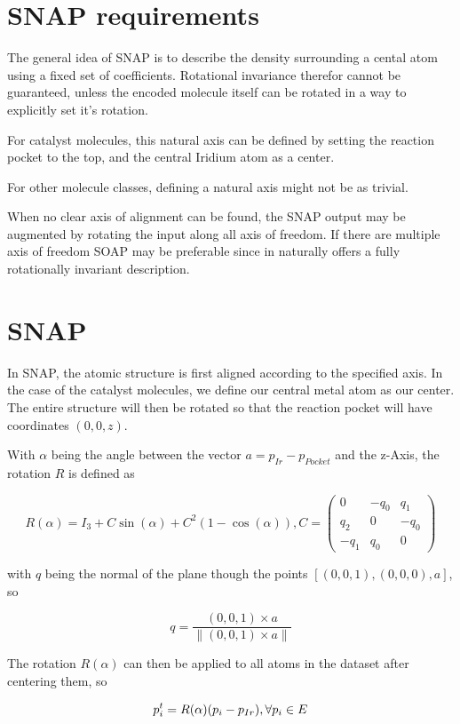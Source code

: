 \section{SNAP requirements}

The general idea of SNAP is to describe the density surrounding a cental atom using a fixed set of coefficients.
Rotational invariance therefor cannot be guaranteed, unless the encoded molecule itself can be rotated in a way to explicitly set it's rotation.

For catalyst molecules, this natural axis can be defined by setting the reaction pocket to the top, and the central Iridium atom as a center.

For other molecule classes, defining a natural axis might not be as trivial.

When no clear axis of alignment can be found, the SNAP output may be augmented by rotating the input along all axis of freedom.
If there are multiple axis of freedom SOAP may be preferable since in naturally offers a fully rotationally invariant description.

\section{SNAP}

In SNAP, the atomic structure is first aligned according to the specified axis. 
In the case of the catalyst molecules, we define our central metal atom as our center. 
The entire structure will then be rotated so that the reaction pocket will have coordinates $(0,0,z)$.

With $\alpha$ being the angle between the vector $a = p_{Ir} - p_{Pocket}$ and the z-Axis, the rotation $R$ is defined as

$$
R(\alpha) = I_3 + C \sin(\alpha) + C^2(1 - \cos(\alpha)), C =
\begin{pmatrix}
  0 & -q_0 & q_1 \\
  q_2 & 0 & -q_0\\
  -q_1 & q_0 & 0
\end{pmatrix}
$$

with $q$ being the normal of the plane though the points $[(0,0,1), (0,0,0), a]$, so 

$$
q = \frac{ (0,0,1) \times a } { \| (0,0,1) \times a \|  }
$$

The rotation $R(\alpha)$ can then be applied to all atoms in the dataset after centering them, so 

$$
p^t_i = R(\alpha) (p_i - p_{Ir}),  \space \forall p_i \in E
$$

